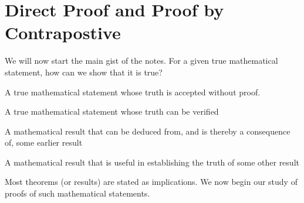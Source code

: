\section{Direct Proof and Proof by Contrapostive}
We will now start the main gist of the notes. For a given true mathematical
statement, how can we show that it is true? 
\begin{defi}[Axiom]
     A true mathematical statement whose truth is accepted without proof.
\end{defi}
\begin{defi}[Theorem]
    A true mathematical statement whose truth can be verified 
\end{defi}
\begin{defi}[Corrolary]
    A mathematical result that can be deduced from, and is thereby a
    consequence of, some earlier result
\end{defi}
\begin{defi}[Lemma]
    A mathematical result that is useful in establishing the truth of some other
    result
\end{defi}

Most theorems (or results) are stated as implications. We now begin our study of
proofs of such mathematical statements.

